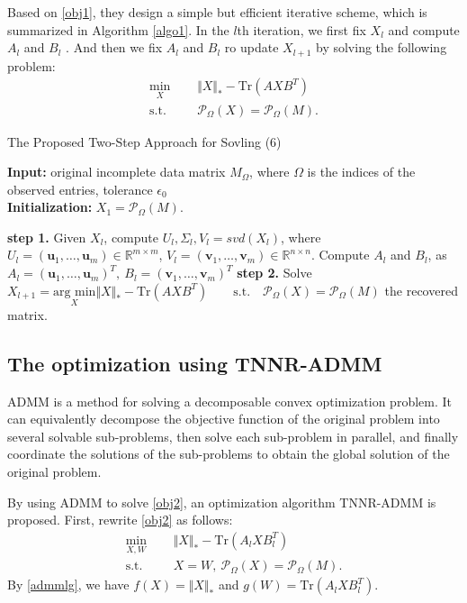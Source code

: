 \documentclass{article}
\begin{document}
{Based on \eqref{obj1},  they design a simple but efficient iterative scheme, which is summarized in Algorithm \ref{algo1}. In the $l$th iteration, we first fix $X_l$ and compute $A_l$ and $B_l$ . And then we fix $A_l$ and $B_l$ ro update $X_{l+1}$ by  solving the following problem:
\begin{equation}
	\label{obj2}
\begin{aligned}
	\underset{X}{\min} \ \ \ \ & \ \  \Vert X \Vert_* - \text{Tr}(AXB^T) \\
	\text{s.t.} \ \ \ \ & \ \    \mathcal{P}_{\Omega}(X) =  \mathcal{P}_{\Omega}(M).
\end{aligned}
\end{equation}

\begin{algorithm}[t]
	\caption{The Proposed Two-Step Approach for Sovling (6)}
	\label{algo1}
	\textbf{Input:} original incomplete data matrix $M_{\Omega}$, where $\Omega$ is the indices of the observed entries, tolerance $\epsilon_0$ \\
	\textbf{Initialization:} $X_1 = \mathcal{P}_{\Omega}(M)$. 
	\begin{algorithmic}
		\Repeat 
		\State \textbf{step 1.} Given $X_l$, compute $U_l, \Sigma_l, V_l = svd(X_l)$, 
		\State where $U_l = (\bm u_1,\dots,\bm u_m) \in \mathbb{R}^{m \times m}$, $V_l = (\bm v_1,\dots,\bm v_m) \in \mathbb{R}^{n \times n}$. 
		\State Compute $A_l$ and $B_l$, as $A_l = (\bm u_1,\dots,\bm u_m)^T, \ B_l = (\bm v_1,\dots,\bm v_m)^T$
		\State \textbf{step 2.} Solve $X_{l+1} = \underset{X}{\text{arg min}} \Vert X \Vert_* - \text{Tr}(AXB^T) \qquad \text{s.t.} \quad \mathcal{P}_{\Omega}(X) =  \mathcal{P}_{\Omega}(M)$ 
		\State \Return the recovered matrix.
	\end{algorithmic}
\end{algorithm}



\subsection{The optimization using TNNR-ADMM}
ADMM is a method for solving a decomposable convex optimization problem. It can equivalently decompose the objective function of the original problem into several solvable sub-problems, then solve each sub-problem in parallel, and finally coordinate the solutions of the sub-problems to obtain the global solution of the original problem.

By using ADMM to solve \eqref{obj2}, an optimization algorithm TNNR-ADMM is proposed. First, rewrite \eqref{obj2} as follows:
\begin{equation}
	\label{objadmm}
	\begin{aligned}
		\underset{X,W}{\min} \ \ \ \ & \ \  \Vert X \Vert_* - \text{Tr}(A_l X B_l^T) \\
		\text{s.t.} \ \ \ \ & \ \    X=W, \ \mathcal{P}_{\Omega}(X) =  \mathcal{P}_{\Omega}(M).
	\end{aligned}
\end{equation}
By \eqref{admmlg}, we have $f(X)=\Vert X \Vert_*$ and $g(W) = \text{Tr}(A_l X B_l^T)$. 

}
\end{document}
